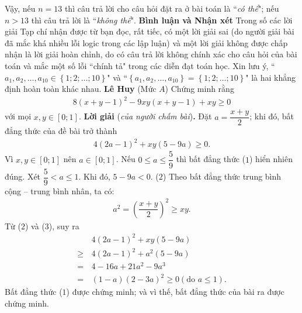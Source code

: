 \begin{multicols}{2}
	Vậy, nếu $n = 13$ thì câu trả lời cho câu hỏi đặt ra ở bài toán là ``\textit{có thể}"; nếu $n > 13$ thì câu trả lời là ``\textit{không thể}".
	\vskip 0.05cm
	\textbf{\color{thachthuctoanhoc}Bình luận và Nhận xét}
	\vskip 0.05cm
	Trong số các lời giải Tạp chí nhận được từ bạn đọc, rất tiếc, có một lời giải sai (do người giải bài đã mắc khá nhiều lỗi logic trong các lập luận) và một lời giải không được chấp nhận là lời giải hoàn chỉnh, do có câu trả lời không chính xác cho câu hỏi của bài toán và mắc một số lỗi ``chính tả" trong các diễn đạt toán học.
	\vskip 0.05cm
	Xin lưu ý, ``${a_1},{a_2}, \ldots ,{a_{10}} \in \left\{ {1;2; \ldots ;10} \right\}$" và ``$\left\{ {{a_1},{a_2}, \ldots ,{a_{10}}} \right\} = \left\{ {1;2; \ldots ;10} \right\}$" là hai khẳng định hoàn toàn khác nhau.
	\vskip 0.05cm
	\hfill \textbf{\color{thachthuctoanhoc}Lê Huy}
	\vskip 0.05cm
	{}
	(Mức $A$) Chứng minh rằng
	\begin{align*}
		8(x+y-1)^2-9xy(x+y-1)+xy\ge0
	\end{align*}
	với mọi $x,y\in[0;1]$. 
	\vskip 0.05cm
	\textbf{\color{thachthuctoanhoc}Lời giải} (\textit{của người chấm bài})\textbf{\color{thachthuctoanhoc}.}
	\vskip 0.05cm
	Đặt $a = \dfrac{x + y}{2}$; khi đó, bất đẳng thức của đề bài trở thành
	\begin{align*}
		4{\left( {2a - 1} \right)^2} + xy\left( {5 - 9a} \right) \ge 0. \tag{$1$}
	\end{align*}
	Vì $x, y \in [0; 1]$ nên $a \in [0; 1]$.
	\vskip 0.05cm
	Nếu  $0 \le a \le \dfrac{5}{9}$ thì bất đẳng thức ($1$) hiển nhiên đúng.
	\vskip 0.05cm
	Xét $\dfrac{5}{9} < a \le 1$.
	\vskip 0.05cm  
	Khi đó, $5 - 9a < 0.$ \hfill ($2$)
	\vskip 0.05cm
	Theo bất đẳng thức trung bình cộng -- trung bình nhân, ta có:
	\begin{align*}
		{a^2} = {\left( {\dfrac{{x + y}}{2}} \right)^2} \ge xy. \tag{$3$}
	\end{align*}
	Từ ($2$) và ($3$), suy ra
	\begin{align*}
			&4{\left( {2a - 1} \right)^2} + xy\left( {5 - 9a} \right) \\
			\ge \,&4{\left( {2a - 1} \right)^2} + {a^2}\left( {5 - 9a} \right)\\
		 = \,&4 - 16a + 21{a^2} - 9{a^3}\\
		= \,&\left( {1 - a} \right){\left( {2 - 3a} \right)^2} \ge 0\left( {{\text{do }}a \le 1} \right).
	\end{align*}
	Bất đẳng thức ($1$) được chứng minh; và vì thế, bất đẳng thức của bài ra được chứng minh.

\end{multicols}
